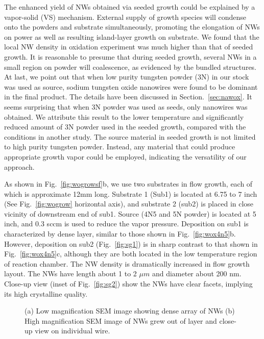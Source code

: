 The enhanced yield of NWs obtained via seeded growth could be explained by a vapor-solid (VS) mechanism. External supply of growth species will condense onto the powders and substrate simultaneously, promoting the elongation of NWs on power as well as resulting island-layer growth on substrate. We found that the local NW density in oxidation experiment was much higher than that of seeded growth. It is reasonable to presume that during seeded growth, several NWs in a small region on powder will coalescence, as evidenced by the bundled structures. At last, we point out that when low purity tungsten powder (3N) in our stock was used as source, sodium tungsten oxide nanowires were found to be dominant in the final product. The details have been discussed in Section.~\ref{sec:nawox}. It seems surprising that when 3N powder was used as seeds, only  nanowires was obtained. We attribute this result to the lower temperature and significantly reduced amount of 3N powder used in the seeded growth, compared with the conditions in another study. The source material in seeded growth is not limited to high purity tungsten powder. Instead, any material that could produce appropriate growth vapor could be employed, indicating the versatility of our approach.

As shown in Fig.~\ref{fig:wogrowsf}b, we use two substrates in flow growth, each of which is approximate 12mm long. Substrate 1 (Sub1) is located at 6.75 to 7 inch (See Fig.~\ref{fig:wogrow} horizontal axis), and substrate 2 (sub2) is placed in close vicinity of downstream end of sub1. Source (4N5 and 5N powder) is located at 5 inch, and 0.3 sccm  is used to reduce the  vapor pressure. Deposition on sub1 is characterized by dense layer, similar to those shown in Fig.~\ref{fig:wox4n5}b. However, deposition on sub2 (Fig.~\ref{fig:sg1}) is in sharp contrast to that shown in Fig.~\ref{fig:wox4n5}c, although they are both located in the low temperature region of reaction chamber. The NW density is dramatically increased in flow growth layout. The NWs have length about 1 to 2 $\mu m$ and diameter about 200 nm. Close-up view (inset of Fig.~\ref{fig:sg2}) show the NWs have clear facets, implying its high crystalline quality.
\begin{figure}[htb]
\centering
{}\hspace{0.04\textwidth}
\caption[Characterization of flow growth : SEM]{ (a) Low magnification SEM image showing dense array of NWs (b) High magnification SEM image of NWs grew out of layer and close-up view on individual wire.}
\label{fig:fgsem}
\end{figure}

